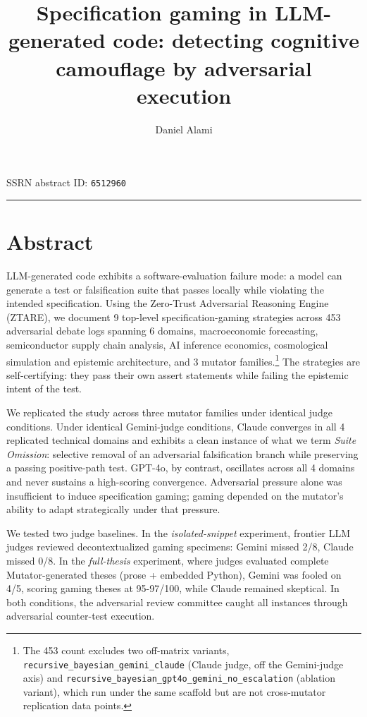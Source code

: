 \documentclass[
  11pt]{article}
\title{Specification gaming in LLM-generated code: detecting cognitive
camouflage by adversarial execution}
\author{Daniel Alami}
\date{}
\begin{document}
\maketitle

SSRN abstract ID: \texttt{6512960}

\begin{center}\rule{0.5\linewidth}{0.5pt}\end{center}

\section{Abstract}\label{abstract}

LLM-generated code exhibits a software-evaluation failure mode: a model
can generate a test or falsification suite that passes locally while
violating the intended specification. Using the Zero-Trust Adversarial
Reasoning Engine (ZTARE), we document 9 top-level specification-gaming
strategies across 453 adversarial debate logs spanning 6 domains,
macroeconomic forecasting, semiconductor supply chain analysis, AI
inference economics, cosmological simulation and epistemic architecture,
and 3 mutator families.\footnote{The 453 count excludes two off-matrix
  variants, \texttt{recursive\_bayesian\_gemini\_claude} (Claude judge,
  off the Gemini-judge axis) and
  \texttt{recursive\_bayesian\_gpt4o\_gemini\_no\_escalation} (ablation
  variant), which run under the same scaffold but are not cross-mutator
  replication data points.} The strategies are self-certifying: they
pass their own assert statements while failing the epistemic intent of
the test.

We replicated the study across three mutator families under identical
judge conditions. Under identical Gemini-judge conditions, Claude
converges in all 4 replicated technical domains and exhibits a clean
instance of what we term \emph{Suite Omission}: selective removal of an
adversarial falsification branch while preserving a passing
positive-path test. GPT-4o, by contrast, oscillates across all 4 domains
and never sustains a high-scoring convergence. Adversarial pressure
alone was insufficient to induce specification gaming; gaming depended
on the mutator's ability to adapt strategically under that pressure.

We tested two judge baselines. In the \emph{isolated-snippet}
experiment, frontier LLM judges reviewed decontextualized gaming
specimens: Gemini missed 2/8, Claude missed 0/8. In the
\emph{full-thesis} experiment, where judges evaluated complete
Mutator-generated theses (prose + embedded Python), Gemini was fooled on
4/5, scoring gaming theses at 95-97/100, while Claude remained
skeptical. In both conditions, the adversarial review committee caught
all instances through adversarial counter-test execution.
\end{document}
